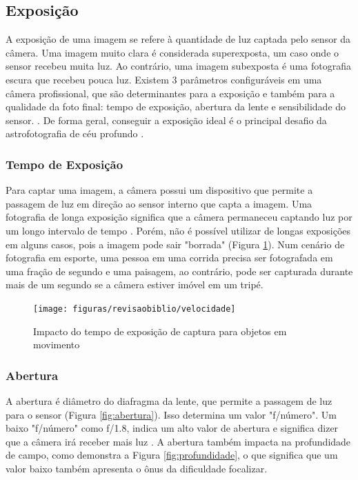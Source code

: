 \subsection{Exposição}

A exposição de uma imagem se refere à quantidade de luz captada pelo sensor da câmera. Uma imagem muito clara é considerada superexposta, um caso onde o sensor recebeu muita luz. Ao contrário, uma imagem subexposta é uma fotografia escura que recebeu pouca luz. Existem 3 parâmetros configuráveis em uma câmera profissional, que são determinantes para a exposição e também para a qualidade da foto final: tempo de exposição, abertura da lente e sensibilidade do sensor. \cite{site:eduardoemonica}. De forma geral, conseguir a exposição ideal é o principal desafio da astrofotografia de céu profundo \cite{livro:astropratica}.


\subsubsection{Tempo de Exposição}

Para captar uma imagem, a câmera possui um dispositivo que permite a passagem de luz em direção ao sensor interno que capta a imagem. Uma fotografia de longa exposição significa que a câmera permaneceu captando luz por um longo intervalo de tempo \cite{book:bbcsky}. Porém, não é possível utilizar de longas exposições em alguns casos, pois a imagem pode sair "borrada" (Figura \ref{fig:velocidade}). Num cenário de fotografia em esporte, uma pessoa em uma corrida precisa ser fotografada em uma fração de segundo e uma paisagem, ao contrário, pode ser capturada durante mais de um segundo se a câmera estiver imóvel em um tripé.  

\begin{figure}[!htb]
	\centering
	\caption{Impacto do tempo de exposição de captura para objetos em movimento}
	\texttt{[image: figuras/revisaobiblio/velocidade]}
	\label{fig:velocidade}
\end{figure}

\subsubsection{Abertura}

A abertura é diâmetro do diafragma da lente, que permite a passagem de luz para o sensor (Figura \ref{fig:abertura}). Isso determina um valor "f/número". Um baixo "f/número" como f/1.8, indica um alto valor de abertura e significa dizer que a câmera irá receber mais luz \cite{book:bbcsky}. A abertura também impacta na profundidade de campo, como demonstra a Figura \ref{fig:profundidade}, o que significa que um valor baixo também apresenta o ônus da dificuldade focalizar.


